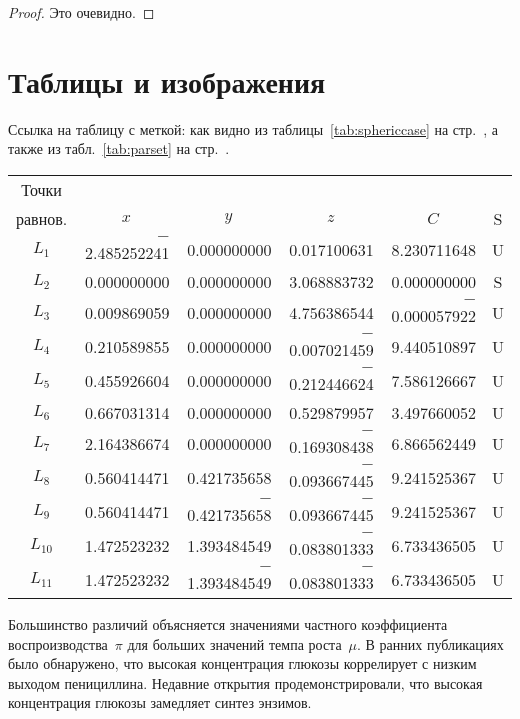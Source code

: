 \documentclass[final,pdftex]{epsilonj}
\numberwithin{equation}{section}
\begin{document}
\begin{proof}
Это очевидно.
\end{proof}

\section{Таблицы и изображения}
Ссылка на таблицу с меткой: как видно из таблицы~\ref{tab:sphericcase} на стр.~\pageref{tab:sphericcase}, а также из табл.~\ref{tab:parset} на стр.~\pageref{tab:parset}.


\begin{table*}
\begin{tabular}{crrrrc}
\toprule
Точки \\
равнов. & \multicolumn{1}{c}{$x$} & \multicolumn{1}{c}{$y$} & \multicolumn{1}{c}{$z$} & \multicolumn{1}{c}{$C$} &
S \\
\midrule
$L_1$ & $-$2.485252241 & 0.000000000 & 0.017100631 & 8.230711648 & U \\
$L_2$ &    0.000000000 & 0.000000000 & 3.068883732 & 0.000000000 & S \\
$L_3$ &    0.009869059 & 0.000000000 & 4.756386544 & $-$0.000057922 & U \\
$L_4$ &    0.210589855 & 0.000000000 & $-$0.007021459 & 9.440510897 & U \\
$L_5$ &    0.455926604 & 0.000000000 & $-$0.212446624 & 7.586126667 & U \\
$L_6$ &    0.667031314 & 0.000000000 & 0.529879957 & 3.497660052 & U \\
$L_7$ &    2.164386674 & 0.000000000 & $-$0.169308438 & 6.866562449 & U \\
$L_8$ &    0.560414471 & 0.421735658 & $-$0.093667445 & 9.241525367 & U \\
$L_9$ &    0.560414471 & $-$0.421735658 & $-$0.093667445 & 9.241525367 & U \\
$L_{10}$ & 1.472523232 & 1.393484549 & $-$0.083801333 & 6.733436505 & U \\
$L_{11}$ & 1.472523232 & $-$1.393484549 & $-$0.083801333 & 6.733436505 & U
\\ \bottomrule
\end{tabular}
\caption{Сферический случай ($I_1=0$, $I_2=0$)}
\label{tab:sphericcase}
\end{table*}

Большинство различий объясняется значениями частного коэффициента воспроизводства~$\pi$ для больших значений темпа роста~$\mu$. В ранних публикациях \cite{lobanov10,burmistrova10} было обнаружено, что высокая концентрация глюкозы коррелирует с низким выходом пенициллина. Недавние открытия \cite{lobanov10,burmistrova10,romanko02,bonar06} продемонстрировали, что высокая концентрация глюкозы замедляет синтез энзимов.
\end{document}
